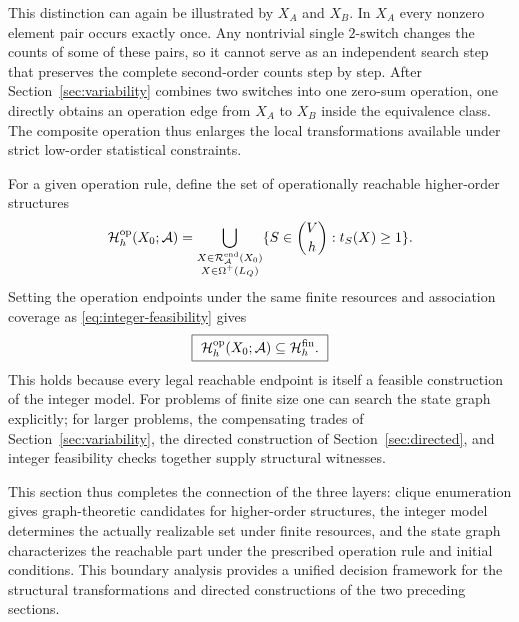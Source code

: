 \documentclass[11pt,a4paper]{article}
\numberwithin{equation}{section}
\theoremstyle{definition}
\numberwithin{algorithm}{section}
\begin{document}
This distinction can again be illustrated by $X_A$ and $X_B$.
In $X_A$ every nonzero element pair occurs exactly once.
Any nontrivial single $2$-switch changes the counts of some of these pairs, so it cannot serve
as an independent search step that preserves the complete second-order counts step by step.
After Section~\ref{sec:variability} combines two switches into one zero-sum operation, one
directly obtains an operation edge from $X_A$ to $X_B$ inside the equivalence class.
The composite operation thus enlarges the local transformations available under strict
low-order statistical constraints.

For a given operation rule, define the set of operationally reachable higher-order structures
\begin{equation}
\mathcal H_h^{\rm op}(X_0;\mathcal A)
=\bigcup_{\substack{X\in\mathcal R_{\mathcal A}^{\rm end}(X_0)\\
X\in\Omega^+(L_Q)}}
\{S\in\binom Vh:t_S(X)\ge1\}.
\label{eq:operation-family}
\end{equation}
Setting the operation endpoints under the same finite resources and association coverage as
\eqref{eq:integer-feasibility} gives
\begin{equation}
\boxed{\ 
\mathcal H_h^{\rm op}(X_0;\mathcal A)
\subseteq\mathcal H_h^{\rm fin}.
\ }
\label{eq:finite-operation-inclusion}
\end{equation}
This holds because every legal reachable endpoint is itself a feasible construction of the
integer model.
For problems of finite size one can search the state graph explicitly;
for larger problems, the compensating trades of Section~\ref{sec:variability}, the directed
construction of Section~\ref{sec:directed}, and integer feasibility checks together supply
structural witnesses.

This section thus completes the connection of the three layers:
clique enumeration gives graph-theoretic candidates for higher-order structures, the integer
model determines the actually realizable set under finite resources, and the state graph
characterizes the reachable part under the prescribed operation rule and initial conditions.
This boundary analysis provides a unified decision framework for the structural
transformations and directed constructions of the two preceding sections.
\end{document}
